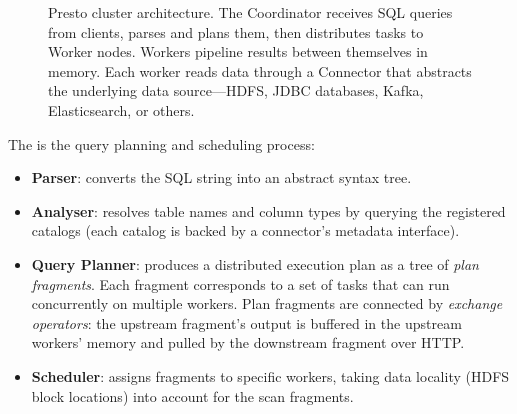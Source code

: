 \begin{figure}[h!t]
\caption{Presto cluster architecture. The Coordinator receives SQL queries from clients,
         parses and plans them, then distributes tasks to Worker nodes. Workers
         pipeline results between themselves in memory. Each worker reads data
         through a Connector that abstracts the underlying data source---HDFS,
         JDBC databases, Kafka, Elasticsearch, or others.}
\label{fig:presto-arch}
\end{figure}

The  is the query planning and scheduling process:
\begin{itemize}
  \item \textbf{Parser}: converts the SQL string into an abstract syntax
        tree.
  \item \textbf{Analyser}: resolves table names and column types by
        querying the registered catalogs (each catalog is backed by a
        connector's metadata interface).
  \item \textbf{Query Planner}: produces a distributed execution plan
        as a tree of \emph{plan fragments}. Each fragment corresponds to
        a set of tasks that can run concurrently on multiple workers.
        Plan fragments are connected by \emph{exchange operators}: the
        upstream fragment's output is buffered in the upstream workers'
        memory and pulled by the downstream fragment over HTTP.
  \item \textbf{Scheduler}: assigns fragments to specific workers, taking
        data locality (HDFS block locations) into account for the scan
        fragments.
\end{itemize}

